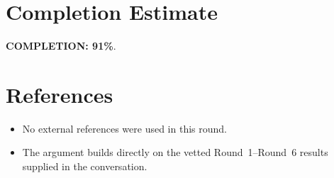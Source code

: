 \section{Completion Estimate}
\textbf{COMPLETION: 91\%}.

\section{References}
\begin{itemize}
\item No external references were used in this round.
\item The argument builds directly on the vetted Round~1--Round~6 results supplied in the conversation.
\end{itemize}
